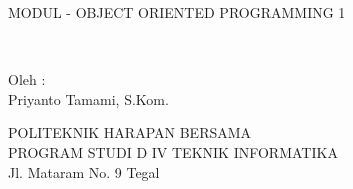 \begin{titlepage}

\begin{center}
{\large MODUL - OBJECT ORIENTED PROGRAMMING 1}

\HRule\\[1cm]



\vfill

Oleh :\\
Priyanto Tamami, S.Kom.

\vfill

POLITEKNIK HARAPAN BERSAMA \\
PROGRAM STUDI D IV TEKNIK INFORMATIKA \\
Jl. Mataram No. 9 Tegal

\end{center}

\end{titlepage}
